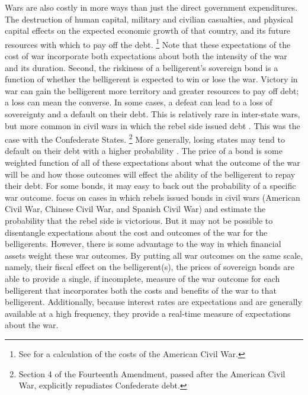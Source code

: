 Wars are also costly in more ways than just the direct government expenditures.
The destruction of human capital, military and civilian casualties, and physical capital effects on the expected economic growth of that country, and its future resources with which to pay off the debt.%
\footnote{See \textcite{GoldinLewis1975} for a calculation of the costs of the American Civil War.}
Note that these expectations of the cost of war incorporate both expectations about both the intensity of the war and its duration.
Second, the riskiness of a belligerent's sovereign bond is a function of whether the belligerent is expected to win or lose the war.
Victory in war can gain the belligerent more territory and greater resources to pay off debt; a loss can mean the converse.
In some cases, a defeat can lead to a loss of sovereignty and a default on their debt.
This is relatively rare in inter-state wars, but more common in civil wars in which the rebel side issued debt \parencite{HaberMitchenerOosterlinckEtAl2015}.
This was the case with the Confederate States.%
\footnote{Section 4 of the Fourteenth Amendment, passed after the American Civil War, explicitly repudiates Confederate debt.}
More generally, losing states may tend to default on their debt with a higher probability \parencite{Slantchev2012a}.
The price of a bond is some weighted function of all of these expectations about what the outcome of the war will be and how those outcomes will effect the ability of the belligerent to repay their debt.
For some bonds, it may easy to back out the probability of a specific war outcome.
\textcite{HaberMitchenerOosterlinckEtAl2015} focus on cases in which rebels issued bonds in civil wars (American Civil War, Chinese Civil War, and Spanish Civil War) and estimate the probability that the rebel side is victorious.
But it may not be possible to disentangle expectations about the cost and outcomes of the war for the belligerents.
However, there is some advantage to the way in which financial assets weight these war outcomes.
By putting all war outcomes on the same scale, namely, their fiscal effect on the belligerent(s), the prices of sovereign bonds are able to provide a single, if incomplete, measure of the war outcome for each belligerent that incorporates both the costs and benefits of the war to that belligerent.
Additionally, because interest rates are expectations and are generally available at a high frequency, they provide a real-time measure of expectations about the war.
